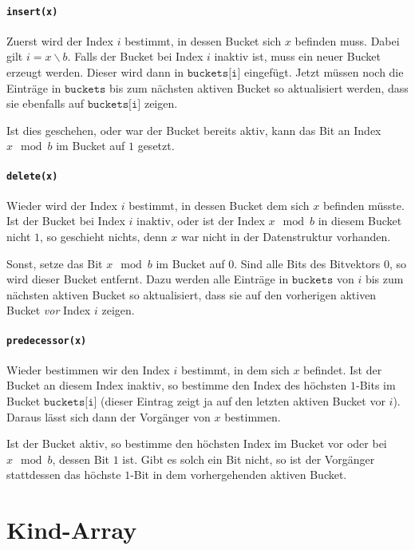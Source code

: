 \paragraph{\texttt{insert(x)}}

Zuerst wird der Index $i$ bestimmt, in dessen Bucket sich $x$ befinden muss. Dabei gilt $i = x \backslash b$. Falls der Bucket bei Index $i$ inaktiv ist, muss ein neuer Bucket erzeugt werden. Dieser wird dann in $\texttt{buckets[i]}$ eingefügt.
Jetzt müssen noch die Einträge in $\texttt{buckets}$ bis zum nächsten aktiven Bucket so aktualisiert werden, dass sie ebenfalls auf $\texttt{buckets[i]}$ zeigen.

Ist dies geschehen, oder war der Bucket bereits aktiv, kann das Bit an Index $x \mod b$ im Bucket auf $1$ gesetzt.

\paragraph{\texttt{delete(x)}}

Wieder wird der Index $i$ bestimmt, in dessen Bucket dem sich $x$ befinden müsste. Ist der Bucket bei Index $i$ inaktiv, oder ist der Index $x \mod b$ in diesem Bucket nicht $1$, so geschieht nichts, denn $x$ war nicht in der Datenstruktur vorhanden.

Sonst, setze das Bit $x \mod b$ im Bucket auf $0$. Sind alle Bits des Bitvektors $0$, so wird dieser Bucket entfernt. Dazu werden alle Einträge in $\texttt{buckets}$ von $i$ bis zum nächsten aktiven Bucket so aktualisiert, dass sie auf den vorherigen aktiven Bucket \textit{vor} Index $i$ zeigen.

\paragraph{\texttt{predecessor(x)}}

Wieder bestimmen wir den Index $i$ bestimmt, in dem sich $x$ befindet. Ist der Bucket an diesem Index inaktiv, so bestimme den Index des höchsten $1$-Bits im Bucket $\texttt{buckets[i]}$ (dieser Eintrag zeigt ja auf den letzten aktiven Bucket vor $i$). Daraus lässt sich dann der Vorgänger von $x$ bestimmen.

Ist der Bucket aktiv, so bestimme den höchsten Index im Bucket vor oder bei $x \mod b$, dessen Bit $1$ ist. Gibt es solch ein Bit nicht, so ist der Vorgänger stattdessen das höchste $1$-Bit in dem vorhergehenden aktiven Bucket.

\section{Kind-Array}

